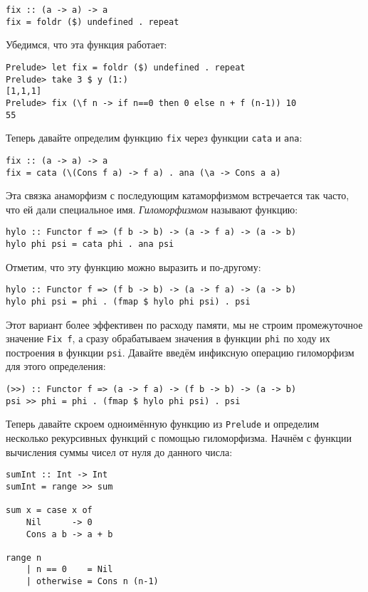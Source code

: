 \begin{verbatim}
fix :: (a -> a) -> a
fix = foldr ($) undefined . repeat 
\end{verbatim}

Убедимся, что эта функция работает:

\begin{verbatim}
Prelude> let fix = foldr ($) undefined . repeat
Prelude> take 3 $ y (1:)
[1,1,1]
Prelude> fix (\f n -> if n==0 then 0 else n + f (n-1)) 10
55
\end{verbatim}

Теперь давайте определим функцию \texttt{fix} через функции
\texttt{cata} и \texttt{ana}:

\begin{verbatim}
fix :: (a -> a) -> a
fix = cata (\(Cons f a) -> f a) . ana (\a -> Cons a a)
\end{verbatim}

Эта связка анаморфизм с последующим катаморфизмом встречается так часто,
что ей дали специальное имя. \emph{Гиломорфизмом} называют функцию:

\begin{verbatim}
hylo :: Functor f => (f b -> b) -> (a -> f a) -> (a -> b) 
hylo phi psi = cata phi . ana psi
\end{verbatim}

Отметим, что эту функцию можно выразить и по-другому:

\begin{verbatim}
hylo :: Functor f => (f b -> b) -> (a -> f a) -> (a -> b) 
hylo phi psi = phi . (fmap $ hylo phi psi) . psi
\end{verbatim}

Этот вариант более эффективен по расходу памяти, мы не строим
промежуточное значение \texttt{Fix f}, а сразу обрабатываем значения в
функции \texttt{phi} по ходу их построения в функции \texttt{psi}.
Давайте введём инфиксную операцию гиломорфизм для этого определения:

\begin{verbatim}
(>>) :: Functor f => (a -> f a) -> (f b -> b) -> (a -> b) 
psi >> phi = phi . (fmap $ hylo phi psi) . psi
\end{verbatim}

Теперь давайте скроем одноимённую функцию из \texttt{Prelude} и
определим несколько рекурсивных функций с помощью гиломорфизма. Начнём с
функции вычисления суммы чисел от нуля до данного числа:

\begin{verbatim}
sumInt :: Int -> Int
sumInt = range >> sum
    
sum x = case x of
    Nil      -> 0 
    Cons a b -> a + b

range n 
    | n == 0    = Nil 
    | otherwise = Cons n (n-1)
\end{verbatim}

